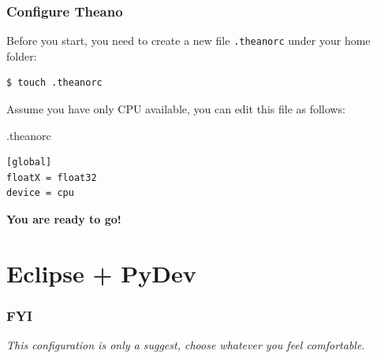 \documentclass{beamer}
\begin{document}
\begin{frame}[fragile]
  \frametitle{Configure Theano}
  Before you start, you need to create a new file \texttt{.theanorc} under your home folder:
\begin{verbatim}
$ touch .theanorc
\end{verbatim}
  
  Assume you have only CPU available, you can edit this file as follows:
  \begin{block}{.theanorc}
\begin{verbatim}
[global]
floatX = float32
device = cpu
\end{verbatim}
  \end{block}
  
  \textbf{You are ready to go!} \smiley
\end{frame}

\section{Eclipse + PyDev}

\begin{frame}
\frametitle{FYI}
\begin{center}
\emph{This configuration is only a suggest, choose whatever you feel comfortable.}
\end{center}
\end{frame}
\end{document}
